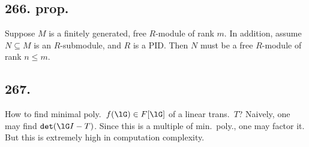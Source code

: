 \documentclass[12pt]{article}
\newcommand{\Tw}[1]{\texttt{#1}}%
\begin{document}
\subsection*{266. prop.} Suppose \(M\) is a finitely generated, free \(R\)-module of rank \(m\). 
In addition, assume \(N \subseteq M\) is an \(R\)-submodule, and \(R\) is a PID. 
Then \(N\) must be a free \(R\)-module of rank \(n \leq m\). 

\subsection*{267.} How to find minimal poly.\ \(f(\lG) \in F[\lG]\) of a linear trans.\ \(T\)? 
Na\:ively, one may find \(\Tw{det}(\lG I -T)\). 
Since this is a multiple of min.\ poly., one may factor it. 
But this is extremely high in computation complexity. 
\end{document}
